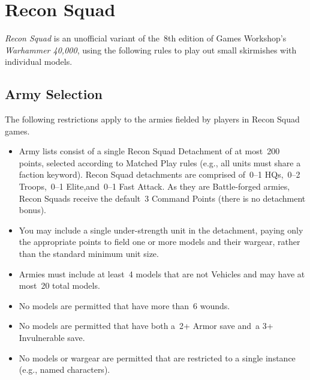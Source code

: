 \chapter{Recon Squad}

\emph{Recon Squad} is an unofficial variant of the~8th edition of
Games Workshop's \emph{Warhammer 40,000}, using the following rules to
play out small skirmishes with individual models.

\section{Army Selection}

The following restrictions apply to the armies fielded by players in
Recon Squad games.

\begin{itemize}\shortlist
\item Army lists consist of a single Recon Squad Detachment of at
  most~200 points, selected according to Matched Play rules (e.g., all
  units must share a faction keyword).  Recon Squad detachments are
  comprised of~0--1 HQs,~0--2 Troops,~0--1 Elite,and~0--1 Fast Attack.
  As they are Battle-forged armies, Recon Squads receive the default~3
  Command Points (there is no detachment bonus).

\item You may include a single under-strength unit in the detachment,
  paying only the appropriate points to field one or more models and
  their wargear, rather than the standard minimum unit size.

\item Armies must include at least~4 models that are not Vehicles and
  may have at most~20 total models.

\item No models are permitted that have more than~6 wounds.

\item No models are permitted that have both a~2+ Armor save and~a 3+
  Invulnerable save.

\item No models or wargear are permitted that are restricted to a
  single instance (e.g., named characters).

  \end{itemize}
  

